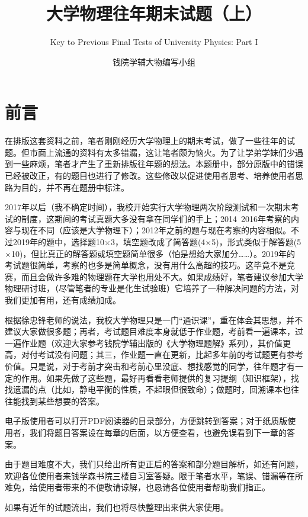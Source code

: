 \documentclass[b5paper,opensource]{qyxf-book}%
\title{大学物理往年期末试题（上）}
\subtitle{Key to Previous Final Tests of University Physics: Part I}
\author{钱院学辅大物编写小组}
\begin{document}
\maketitle
\pagestyle{plain}
\chapter*{前言}%
在排版这套资料之前，笔者刚刚经历大学物理上的期末考试，做了一些往年的试题。但市面上流通的资料有太多错漏，这让笔者颇为恼火。为了让学弟学妹们少遇到一些麻烦，笔者才产生了重新排版往年题的想法。本题册中，部分原版中的错误已经被改正，有的题目也进行了修改。这些修改以促进使用者思考、培养使用者思路为目的，并不再在题册中标注。

2017年以后（我不确定时间），我校开始实行大学物理两次阶段测试和一次期末考试的制度，这期间的考试真题大多没有拿在同学们的手上；2014~2016年考察的内容与现在不同（应该是大学物理下）；2012年之前的题与现在考察的内容相似。不过2019年的题中，选择题10$\times$3，填空题改成了简答题(4$\times$5)，形式类似于解答题(5$\times$10)，但比真正的解答题或填空题简单很多（怕是想给大家加分……）。2019年的考试题很简单，考察的也多是简单概念，没有用什么高超的技巧。这毕竟不是竞赛，而且会做许多难的物理题在大学也用处不大。如果成绩好，笔者建议参加大学物理研讨班，（尽管笔者的专业是化生试验班）它培养了一种解决问题的方法，对我们更加有用，还有成绩加成。

根据徐忠锋老师的说法，我校大学物理只是一门“通识课”，重在体会其思想，并不建议大家做很多题；再者，考试题目难度本身就低于作业题，考前看一遍课本，过一遍作业题（欢迎大家参考钱院学辅出版的《大学物理题解》系列），其价值更高，对付考试没有问题；其三，作业题一直在更新，比起多年前的考试题更有参考价值。只是说，对于考前才突击和考前心里没底、想找感觉的同学，往年题才有一定的作用。如果先做了这些题，最好再看看老师提供的复习提纲（知识框架），找找遗漏的点（比如，静电平衡的性质，不起眼但很致命）；做题时，回溯课本也往往能找到某些想要的答案。

电子版使用者可以打开PDF阅读器的目录部分，方便跳转到答案；对于纸质版使用者，我们将题目答案设在每章的后面，以方便查看，也避免误看到下一章的答案。

由于题目难度不大，我们只给出所有更正后的答案和部分题目解析，如还有问题，欢迎各位使用者来钱学森书院三楼自习室答疑。限于笔者水平，笔误、错漏等在所难免，给使用者带来的不便敬请谅解，也恳请各位使用者帮助我们指正。

如果有近年的试题流出，我们也将尽快整理出来供大家使用。
\vspace{2em}
\end{document}
